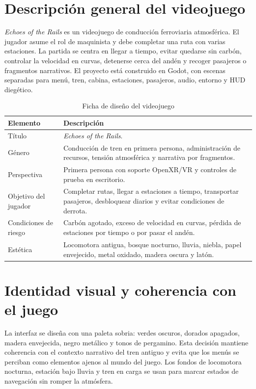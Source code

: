 \documentclass[12pt,letterpaper]{article}
\begin{document}
\section{Descripción general del videojuego}

\textit{Echoes of the Rails} es un videojuego de conducción ferroviaria atmosférica. El jugador asume el rol de maquinista y debe completar una ruta con varias estaciones. La partida se centra en llegar a tiempo, evitar quedarse sin carbón, controlar la velocidad en curvas, detenerse cerca del andén y recoger pasajeros o fragmentos narrativos. El proyecto está construido en Godot, con escenas separadas para menú, tren, cabina, estaciones, pasajeros, audio, entorno y HUD diegético.

\begin{table}[H]
\centering
\caption{Ficha de diseño del videojuego}
\small
\begin{tabularx}{\textwidth}{L{4cm}Y}
\toprule
\textbf{Elemento} & \textbf{Descripción} \\
\midrule
Título & \textit{Echoes of the Rails}. \\
Género & Conducción de tren en primera persona, administración de recursos, tensión atmosférica y narrativa por fragmentos. \\
Perspectiva & Primera persona con soporte OpenXR/VR y controles de prueba en escritorio. \\
Objetivo del jugador & Completar rutas, llegar a estaciones a tiempo, transportar pasajeros, desbloquear diarios y evitar condiciones de derrota. \\
Condiciones de riesgo & Carbón agotado, exceso de velocidad en curvas, pérdida de estaciones por tiempo o por pasar el andén. \\
Estética & Locomotora antigua, bosque nocturno, lluvia, niebla, papel envejecido, metal oxidado, madera oscura y latón. \\
\bottomrule
\end{tabularx}
\end{table}

\section{Identidad visual y coherencia con el juego}

La interfaz se diseña con una paleta sobria: verdes oscuros, dorados apagados, madera envejecida, negro metálico y tonos de pergamino. Esta decisión mantiene coherencia con el contexto narrativo del tren antiguo y evita que los menús se perciban como elementos ajenos al mundo del juego. Los fondos de locomotora nocturna, estación bajo lluvia y tren en carga se usan para marcar estados de navegación sin romper la atmósfera.
\end{document}
